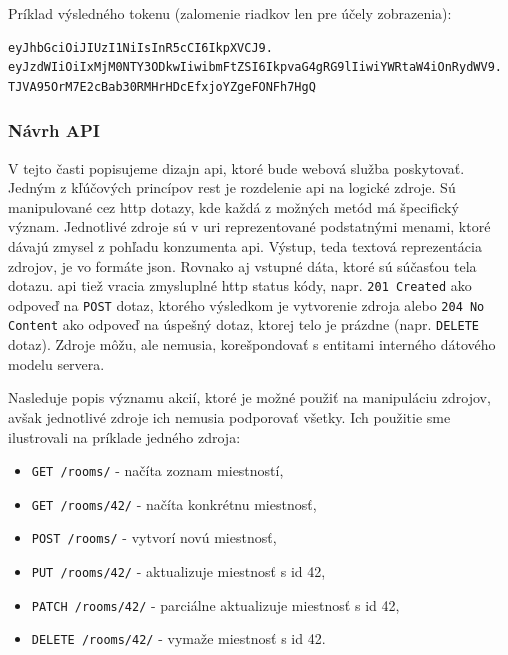 Príklad výsledného tokenu (zalomenie riadkov len pre účely zobrazenia):

\begin{verbatim}
eyJhbGciOiJIUzI1NiIsInR5cCI6IkpXVCJ9.
eyJzdWIiOiIxMjM0NTY3ODkwIiwibmFtZSI6IkpvaG4gRG9lIiwiYWRtaW4iOnRydWV9.
TJVA95OrM7E2cBab30RMHrHDcEfxjoYZgeFONFh7HgQ
\end{verbatim}

\subsubsection{Návrh API}
\label{subsubsec:api_design}

V tejto časti popisujeme dizajn \acrshort{api}, ktoré bude webová služba
poskytovať. Jedným z kľúčových princípov \acrshort{rest} je rozdelenie
\acrshort{api} na logické zdroje. Sú manipulované cez \acrshort{http} dotazy,
kde každá z možných metód má špecifický význam. Jednotlivé zdroje sú v
\acrshort{uri} reprezentované podstatnými menami, ktoré dávajú zmysel z pohľadu
konzumenta \acrshort{api}. Výstup, teda textová reprezentácia zdrojov, je vo
formáte \acrshort{json}. Rovnako aj vstupné dáta, ktoré sú súčasťou tela dotazu.
\acrshort{api} tiež vracia zmysluplné \acrshort{http} status kódy, napr.
\texttt{201 Created} ako odpoveď na \texttt{POST} dotaz, ktorého výsledkom je
vytvorenie zdroja alebo \texttt{204 No Content} ako odpoveď na úspešný dotaz,
ktorej telo je prázdne (napr. \texttt{DELETE} dotaz). Zdroje môžu, ale nemusia,
korešpondovať s entitami interného dátového modelu servera.

Nasleduje popis významu akcií, ktoré je možné použiť na manipuláciu zdrojov,
avšak jednotlivé zdroje ich nemusia podporovať všetky. Ich použitie sme
ilustrovali na príklade jedného zdroja:

\begin{itemize}
\item \texttt{GET /rooms/} - načíta zoznam miestností,
\item \texttt{GET /rooms/42/} - načíta konkrétnu miestnosť,
\item \texttt{POST /rooms/} - vytvorí novú miestnosť,
\item \texttt{PUT /rooms/42/} - aktualizuje miestnosť s \acrshort{id} 42,
\item \texttt{PATCH /rooms/42/} - parciálne aktualizuje miestnosť s
  \acrshort{id} 42,
\item \texttt{DELETE /rooms/42/} - vymaže miestnosť s \acrshort{id} 42.
\end{itemize}

